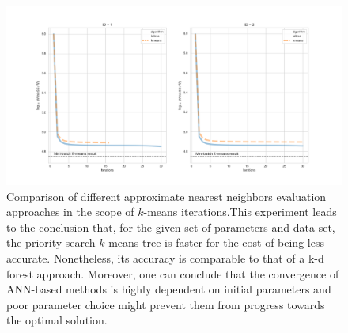 \begin{frame}
	
	\begin{figure}
		\centering
		\includegraphics[width=0.925\linewidth]{../images/flann/comparison}
		\caption{\scriptsize Comparison of different approximate nearest neighbors evaluation approaches in the scope of $k$-means iterations.\footnotemark This experiment leads to the conclusion that, for the given set of parameters and data set, the priority search $k$-means tree is faster for the cost of being less accurate. Nonetheless, its accuracy is comparable to that of a k-d forest approach. Moreover, one can conclude that the convergence of ANN-based methods is highly dependent on initial parameters and poor parameter choice might prevent them from progress towards the optimal solution.}
		\label{fig:comparison}
		
	\end{figure}
	
\end{frame}